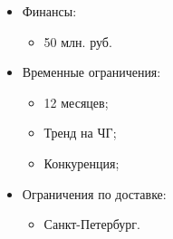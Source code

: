 \documentclass[a4paper,8pt]{article}
\begin{document}
    \begin{itemize}
        \item Финансы:
            \begin{itemize}
                \item 50 млн. руб.
            \end{itemize}
        \item Временные ограничения:
            \begin{itemize}
                \item 12 месяцев;
                \item Тренд на ЧГ;
                \item Конкуренция;
            \end{itemize}
        \item Ограничения по доставке:
            \begin{itemize}
                \item Санкт-Петербург.
            \end{itemize}
    \end{itemize}
\end{document}
